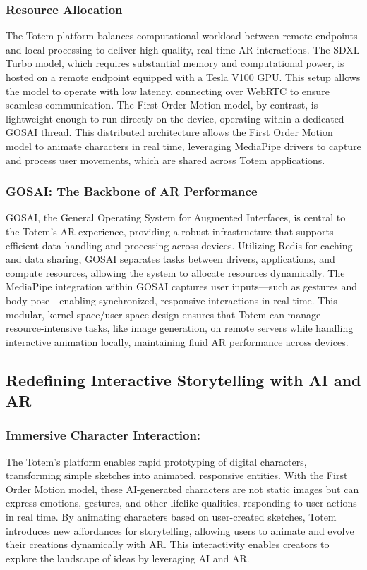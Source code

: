 \subsubsection{Resource Allocation}
The Totem platform balances computational workload between remote endpoints and local processing to deliver high-quality, real-time AR interactions.
The SDXL Turbo model, which requires substantial memory and computational power, is hosted on a remote endpoint equipped with a Tesla V100 GPU.
This setup allows the model to operate with low latency, connecting over WebRTC to ensure seamless communication.
The First Order Motion model, by contrast, is lightweight enough to run directly on the device, operating within a dedicated GOSAI thread.
This distributed architecture allows the First Order Motion model to animate characters in real time, leveraging MediaPipe drivers to capture and process user movements, which are shared across Totem applications.

\subsubsection{GOSAI: The Backbone of AR Performance}
GOSAI, the General Operating System for Augmented Interfaces, is central to the Totem’s AR experience, providing a robust infrastructure that supports efficient data handling and processing across devices.
Utilizing Redis for caching and data sharing, GOSAI separates tasks between drivers, applications, and compute resources, allowing the system to allocate resources dynamically.
The MediaPipe integration within GOSAI captures user inputs—such as gestures and body pose—enabling synchronized, responsive interactions in real time.
This modular, kernel-space/user-space design ensures that Totem can manage resource-intensive tasks, like image generation, on remote servers while handling interactive animation locally, maintaining fluid AR performance across devices.

\subsection{Redefining Interactive Storytelling with AI and AR}
\subsubsection{Immersive Character Interaction:}
The Totem’s platform enables rapid prototyping of digital characters, transforming simple sketches into animated, responsive entities.
With the First Order Motion model, these AI-generated characters are not static images but can express emotions, gestures, and other lifelike qualities, responding to user actions in real time.
By animating characters based on user-created sketches, Totem introduces new affordances for storytelling, allowing users to animate and evolve their creations dynamically with AR.
This interactivity enables creators to explore the landscape of ideas by leveraging AI and AR.

